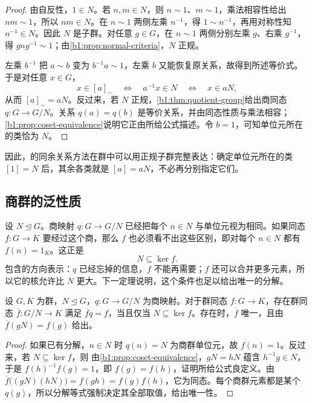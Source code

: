 \begin{proof}
	由自反性，\(1\in N\)。若 \(n,m\in N\)，则 \(n\sim1\)、\(m\sim1\)，乘法相容性给出 \(nm\sim1\)，所以 \(nm\in N\)。在 \(n\sim1\) 两侧左乘 \(n^{-1}\)，得 \(1\sim n^{-1}\)，再用对称性知 \(n^{-1}\in N\)。因此 \(N\) 是子群。对任意 \(g\in G\)，在 \(n\sim1\) 两侧分别左乘 \(g\)、右乘 \(g^{-1}\)，得 \(gng^{-1}\sim1\)；由\cref{b1:prop:normal-criteria}，\(N\) 正规。

	左乘 \(b^{-1}\) 把 \(a\sim b\) 变为 \(b^{-1}a\sim1\)，左乘 \(b\) 又能恢复原关系，故得到所述等价式。于是对任意 \(x\in G\)，
	\[
		x\in[a]_{\sim}\quad\Longleftrightarrow\quad a^{-1}x\in N\quad\Longleftrightarrow\quad x\in aN,
	\]
	从而 \([a]_{\sim}=aN\)。反过来，若 \(N\) 正规，\cref{b1:thm:quotient-group}给出商同态 \(q:G\rightarrow G/N\)。关系 \(q(a)=q(b)\) 是等价关系，并由同态性质与乘法相容；\cref{b1:prop:coset-equivalence}说明它正由所给公式描述。令 \(b=1\)，可知单位元所在的类恰为 \(N\)。
\end{proof}

因此，的同余关系方法在群中可以用正规子群完整表达：确定单位元所在的类 \([1]=N\) 后，其余各类就是 \([a]=aN\)，不必再分别指定它们。

\subsection{商群的泛性质}
\label{b1:subsec:0203:02}

设 \(N\trianglelefteq G\)。商映射 \(q:G\rightarrow G/N\) 已经把每个 \(n\in N\) 与单位元视为相同。如果同态 \(f:G\rightarrow K\) 要经过这个商，那么 \(f\) 也必须看不出这些区别，即对每个 \(n\in N\) 都有 \(f(n)=1_K\)。这正是
\[
	N\subseteq\ker f.
\]
包含的方向表示：\(q\) 已经忘掉的信息，\(f\) 不能再需要；\(f\) 还可以合并更多元素，所以它的核允许比 \(N\) 更大。下一定理说明，这个条件也足以给出唯一的分解。

\begin{theorem}[商群的泛性质]\label{b1:thm:quotient-universal}
	设 \(G,K\) 为群，\(N\trianglelefteq G\)，\(q:G\rightarrow G/N\) 为商映射。对于群同态 \(f:G\rightarrow K\)，存在群同态 \(\overline f:G/N\rightarrow K\) 满足 \(\overline f q=f\)，当且仅当 \(N\subseteq\ker f\)。存在时，\(\overline f\) 唯一，且由 \(\overline f(gN)=f(g)\) 给出。
\end{theorem}

\begin{proof}
	如果已有分解，\(n\in N\) 时 \(q(n)=N\) 为商群单位元，故 \(f(n)=1\)。反过来，若 \(N\subseteq\ker f\)，则 由\cref{b1:prop:coset-equivalence}，\(gN=hN\) 蕴含 \(h^{-1}g\in N\)，于是 \(f(h)^{-1}f(g)=1\)，即 \(f(g)=f(h)\)，证明所给公式良定义。由 \(\overline f\bigl((gN)(hN)\bigr)=f(gh)=f(g)f(h)\)，它为同态。每个商群元素都是某个 \(q(g)\)，所以分解等式强制决定其全部取值，给出唯一性。
\end{proof}

